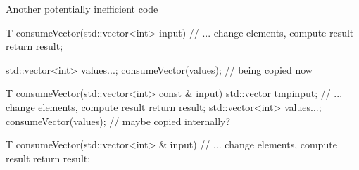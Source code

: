 \begin{frame}[fragile]
  \begin{exampleblock}{Another potentially inefficient code}
    \begin{overprint}
      \begin{cppcode*}{}
        T consumeVector(std::vector<int> input) {
          // ... change elements, compute result
          return result;
        }

        std::vector<int> values{...};
        consumeVector(values); // being copied now
      \end{cppcode*}
      \begin{cppcode*}{}
        T consumeVector(std::vector<int> const & input) {
          std::vector tmp{input};
          // ... change elements, compute result
          return result;
        }
        std::vector<int> values{...};
        consumeVector(values); // maybe copied internally?
      \end{cppcode*}
      \begin{cppcode*}{}
        T consumeVector(std::vector<int> & input) {
          // ... change elements, compute result
          return result;
        }


\end{cppcode*}
\end{overprint}
\end{exampleblock}
\end{frame}
